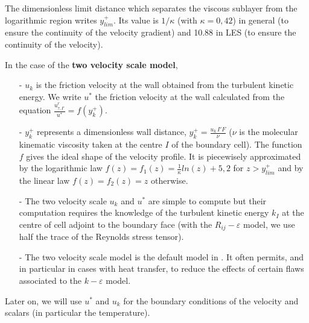 The dimensionless limit distance which separates the viscous sublayer from the logarithmic region writes $y^+_{lim}$. Its value is $1/\kappa$ (with $\kappa = 0,42$) in general (to ensure the continuity of the velocity gradient) and 10.88 in LES (to ensure the continuity of the velocity).

In the case of the {\bf two velocity scale model},
\begin{itemize}
\item [-] $u_k$ is the friction velocity at the wall obtained from the turbulent kinetic energy.
We write $u^*$ the friction velocity at the wall calculated from the equation
 $ \displaystyle\frac{u^r_{\tau,I'}}{u^*} = f(y^+_k)$.

\item [-]
$y^+_k$  represents a dimensionless wall distance,
$y^+_k= \displaystyle\frac{u_k\,I'F}{\nu}$ ($\nu$ is the molecular kinematic viscosity
taken at the centre $I$ of the boundary cell).
The function $f$ gives the ideal shape of the velocity profile.
It is piecewisely approximated by the logarithmic law
 $f(z)=f_1(z)= \displaystyle\frac{1}{\kappa}ln(z)+5,2$ for
$z> y^+_{lim}$
and by the linear law $f(z)=f_2(z)=z$ otherwise.

\item [-] The two velocity scale $u_k$ and $u^*$ are simple to compute
but their computation requires the knowledge of the turbulent kinetic energy $k_I$
at the centre of cell adjoint to the boundary face  (with the $R_{ij}-\varepsilon$ model, we use half the trace of the Reynolds stress tensor).


\item [-] The two velocity scale model is the default model in \CS.
It often permits, and in particular in cases with heat transfer, to reduce the
effects of certain flaws associated to the $k-\varepsilon$ model.
\end{itemize}


Later on, we will use $u^*$ and $u_k$ for the boundary conditions of the velocity and scalars (in particular the temperature).


